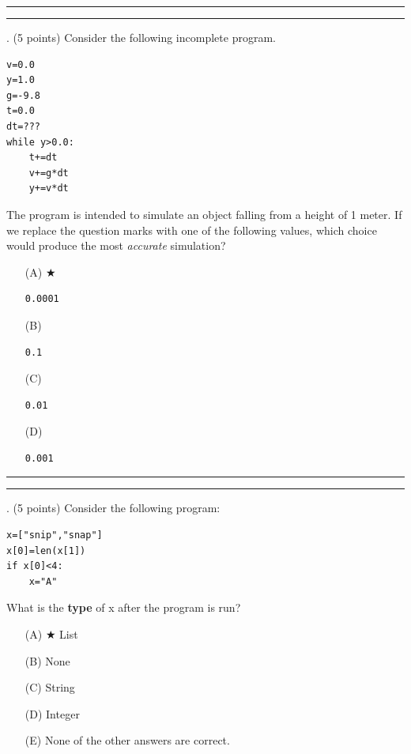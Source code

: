 \documentclass{article}
\newcounter{question}
\begin{document}
\vspace*{2em}
\hrule
\vspace{2em}

\vspace{2em}
\hrule height 2pt


\newpage
{}. (5 points)
Consider the following incomplete program.
\begin{verbatim}
v=0.0
y=1.0
g=-9.8
t=0.0
dt=???
while y>0.0:
    t+=dt
    v+=g*dt
    y+=v*dt
\end{verbatim}
The program is intended to simulate an object falling from a height of 1 meter. If we replace the question marks with one of the following values, which choice would produce the most \textit{accurate} simulation?


\begin{enumerate}
\item[(A)] $\bigstar$ 
\begin{verbatim}0.0001\end{verbatim}

\item[(B)]
\begin{verbatim}0.1\end{verbatim}

\item[(C)]
\begin{verbatim}0.01\end{verbatim}

\item[(D)]
\begin{verbatim}0.001\end{verbatim}

\end{enumerate}

\vspace*{2em}
\hrule
\vspace{2em}

\vspace{2em}
\hrule height 2pt


\newpage
{}. (5 points)
Consider the following program:
\begin{verbatim}
x=["snip","snap"]
x[0]=len(x[1])
if x[0]<4:
    x="A"
\end{verbatim}
What is the \textbf{type} of x after the program is run?


\begin{enumerate}
\item[(A)] $\bigstar$ 
List

\item[(B)]
None

\item[(C)]
String

\item[(D)]
Integer

\item[(E)]
None of the other answers are correct.

\end{enumerate}
\end{document}
